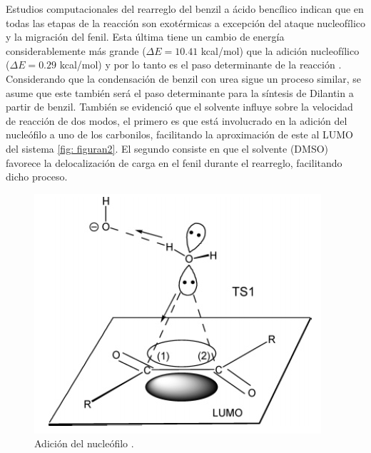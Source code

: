\documentclass[fleqn,10pt]{SelfArx}
\begin{document}
Estudios computacionales del rearreglo del benzil a ácido bencílico indican que en todas las etapas de la reacción son exotérmicas a excepción del ataque nucleofílico y la migración del fenil. Esta última tiene un cambio de energía considerablemente más grande ($\Delta E=10.41$ kcal/mol) que la adición nucleofílico ($\Delta E = 0.29$ kcal/mol) y por lo tanto es el paso determinante de la reacción \cite{yamabe2006}. Considerando que la condensación de benzil con urea sigue un proceso similar, se asume que este también será el paso determinante para la síntesis de Dilantin a partir de benzil. También se evidenció que el solvente influye sobre la velocidad de reacción de dos modos, el primero es que está involucrado en la adición del nucleófilo a uno de los carbonilos, facilitando la aproximación de este al LUMO del sistema \autoref{fig: figuran2}. El segundo consiste en que el solvente (DMSO) favorece la delocalización de carga en el fenil durante el rearreglo, facilitando dicho proceso.
\begin{figure}[h]
	\centering
	\includegraphics[width=0.6\linewidth]{figuran2.png}
	\caption{Adici\'on del nucle\'ofilo \cite{yamabe2006}.}
	\label{fig: figuran2}
\end{figure}
\end{document}
